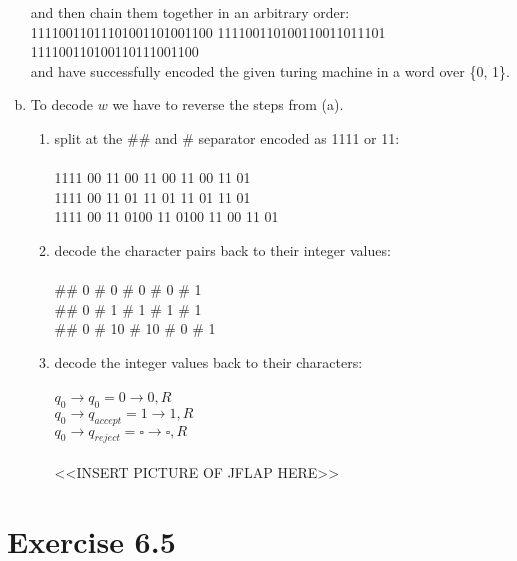 \documentclass{article} %
\newcommand{\homeworkNumber}{6}
\begin{document}
\begin{enumerate}[(a)]
and then chain them together in an arbitrary order:\\
11110011011101001101001100 111100110100110011011101 111100110100110111001100\\
and have successfully encoded the given turing machine in a word over \{0, 1\}.

\clearpage

\item
To decode $w$ we have to reverse the steps from (a).

\begin{enumerate}[1.]
\item split at the $\#\#$ and $\#$ separator encoded as 1111 or 11:\\\\
1111 00 11 00 11 00 11 00 11 01 \\
1111 00 11 01 11 01 11 01 11 01 \\
1111 00 11 0100 11 0100 11 00 11 01 \\

\item decode the character pairs back to their integer values:\\\\
\#\# 0 \# 0 \# 0 \# 0 \# 1 \\
\#\# 0 \# 1 \# 1 \# 1 \# 1 \\
\#\# 0 \# 10 \# 10 \# 0 \# 1 \\

\item decode the integer values back to their characters:\\\\
$q_0 \to q_0 = 0 \to 0, R$\\
$q_0 \to q_{accept} = 1 \to 1, R$\\
$q_0 \to q_{reject} = \square \to \square, R$\\\\

<<INSERT PICTURE OF JFLAP HERE>>

\end{enumerate}
\end{enumerate}

\section*{Exercise \homeworkNumber.5}
\end{document}
